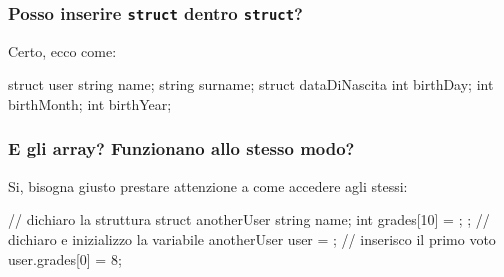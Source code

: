 \documentclass{beamer}
\begin{document}
    \begin{frame}[fragile]
        \frametitle{Posso inserire \texttt{struct} dentro \texttt{struct}?}
        
        \pause
        Certo, ecco come:
        \begin{cppcode}
            struct user {
                string name;
                string surname;
                struct dataDiNascita {
                    int birthDay;
                    int birthMonth;
                    int birthYear;
                } 
            }
        \end{cppcode}
    
    \end{frame}

    \begin{frame}[fragile]
        \frametitle{E gli array? Funzionano allo stesso modo?}
    
        \pause
        Si, bisogna giusto prestare attenzione a come accedere agli stessi:
        \begin{cppcode}
            // dichiaro la struttura
            struct anotherUser {
                string name;
                int grades[10] = {};
            };
            // dichiaro e inizializzo la variabile
            anotherUser user = {};
            // inserisco il primo voto
            user.grades[0] = 8;  
        \end{cppcode}
    
    \end{frame}
\end{document}
